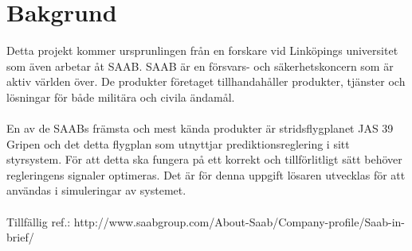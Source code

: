 \section{Bakgrund}    
Detta projekt kommer ursprunlingen från en forskare vid Linköpings universitet som även arbetar åt SAAB. SAAB är en försvars- och säkerhetskoncern som är aktiv världen över. De produkter företaget tillhandahåller produkter, tjänster och lösningar för både militära och civila ändamål. \\ \\
En av de SAABs främsta och mest kända produkter är stridsflygplanet JAS 39 Gripen och det detta flygplan som utnyttjar prediktionsreglering i sitt styrsystem. För att detta ska fungera på ett korrekt och tillförlitligt sätt behöver regleringens signaler optimeras. Det är för denna uppgift lösaren utvecklas för att användas i simuleringar av systemet.
\\ \\ 
Tillfällig ref.: http://www.saabgroup.com/About-Saab/Company-profile/Saab-in-brief/